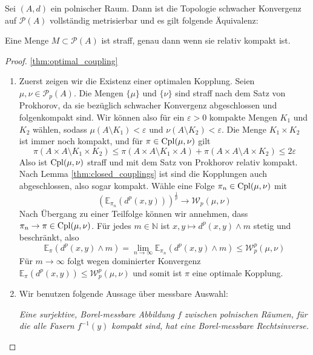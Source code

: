 \begin{theorem}\label{thm:prokhorov}
Sei $(A, d)$ ein polnischer Raum. Dann ist die Topologie schwacher Konvergenz auf $\mathcal{P}(A)$ vollständig metrisierbar und es gilt folgende Äquivalenz:

Eine Menge $M \subset \mathcal{P}(A)$ ist straff, genau dann wenn sie relativ kompakt ist.
\end{theorem}
\begin{proof}\ref{thm:optimal_coupling}
    \begin{enumerate}
        \item
    Zuerst zeigen wir die Existenz einer optimalen Kopplung. Seien $\mu, \nu \in \mathcal{P}_p(A)$. Die Mengen $\{\mu\}$ und $\{\nu\}$ sind straff nach dem Satz von Prokhorov, da sie bezüglich schwacher Konvergenz abgeschlossen und folgenkompakt sind. Wir können also für ein $\varepsilon > 0$ kompakte Mengen $K_1$ und $K_2$ wählen, sodass $\mu(A\setminus K_1) < \varepsilon$ und $\nu(A\setminus K_2) < \varepsilon$. Die Menge $K_1 \times K_2$ ist immer noch kompakt, und für $\pi \in \operatorname{Cpl}(\mu, \nu)$ gilt 
    $$\pi(A\times A \setminus K_1 \times K_2) \leq \pi(A\times A \setminus K_1 \times A) + \pi(A\times A \setminus A \times K_2) \leq 2\varepsilon$$
    Also ist $\operatorname{Cpl}(\mu, \nu)$ straff und mit dem Satz von Prokhorov relativ kompakt. Nach Lemma \ref{thm:closed_couplings} ist sind die Kopplungen auch abgeschlossen, also sogar kompakt. Wähle eine Folge $\pi_n\in \operatorname{Cpl}(\mu, \nu)$ mit 
    $$\left(\mathbb{E}_{\pi_n}(d^p(x,y))\right)^{\frac{1}{p}} \rightarrow \mathcal{W}_p(\mu, \nu)$$
    Nach Übergang zu einer Teilfolge können wir annehmen, dass $\pi_n \rightarrow \pi \in \operatorname{Cpl}(\mu, \nu)$. Für jedes $m \in \mathbb{N}$ ist $x,y\mapsto d^p(x,y)\wedge m$ stetig und beschränkt, also 
    $$\mathbb{E}_\pi(d^p(x,y)\wedge m) = \lim_{n\rightarrow \infty} \mathbb{E}_{\pi_n}(d^p(x,y) \wedge m) \leq \mathcal{W}_p^p(\mu, \nu)$$
    Für $m \rightarrow \infty$ folgt wegen dominierter Konvergenz $\mathbb{E}_\pi(d^p(x,y))\leq \mathcal{W}_p^p(\mu, \nu)$ und somit ist $\pi$ eine optimale Kopplung.
\item 
    Wir benutzen folgende Aussage über messbare Auswahl:

    \emph{Eine surjektive, Borel-messbare Abbildung $f$ zwischen polnischen Räumen, für die alle Fasern $f^{-1}(y)$ kompakt sind, hat eine Borel-messbare Rechtsinverse.}

    \end{enumerate}
\end{proof}

